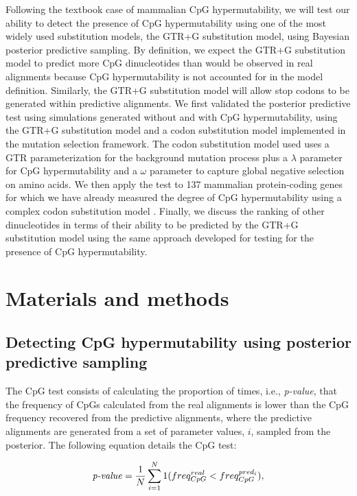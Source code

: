 \documentclass{article}
\begin{document}
Following the textbook case of mammalian CpG hypermutability, we will test our ability to detect the presence of CpG hypermutability using one of the most widely used substitution models, the GTR+G substitution model, using Bayesian posterior predictive sampling.  By definition, we expect the GTR+G substitution model to predict more CpG dinucleotides than would be observed in real alignments because CpG hypermutability is not accounted for in the model definition.  Similarly, the GTR+G substitution model will allow stop codons to be generated within predictive alignments.  We first validated the posterior predictive test using simulations generated without and with CpG hypermutability, using the GTR+G substitution model and a codon substitution model implemented in the mutation selection framework.  The codon substitution model used uses a GTR parameterization for the background mutation process plus a $\lambda$ parameter for CpG hypermutability and a $\omega$ parameter to capture global negative selection on amino acids.  We then apply the test to 137 mammalian protein-coding genes for which we have already measured the degree of CpG hypermutability using a complex codon substitution model \citep{LaurinLemay2018b}. Finally, we discuss the ranking of other dinucleotides in terms of their ability to be predicted by the GTR+G substitution model using the same approach developed for testing for the presence of CpG hypermutability.

\section*{Materials and methods}
\subsection*{Detecting CpG hypermutability using posterior predictive sampling}
The CpG test consists of calculating the proportion of times, i.e., \emph{p-value}, that the frequency of CpGs calculated from the real alignments is lower than the CpG frequency recovered from the predictive alignments, where the predictive alignments are generated from a set of parameter values, $i$, sampled from the posterior.  The following equation details the CpG test:

\begin{equation}\label{test}
 \text{\emph{p-value}} = \frac{1}{N}\sum_{i=1}^{N}1(freq_{CpG}^{real}<freq_{CpG}^{pred_{i}}),
\end{equation}
\end{document}
